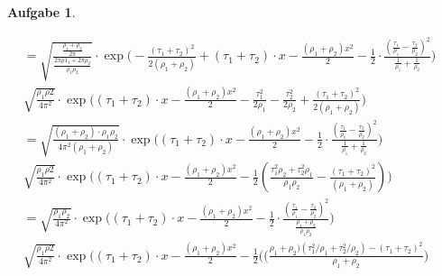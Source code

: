 \documentclass[12pt]{scrartcl}
\theoremstyle{definition}
\theoremstyle{exercise}
\newtheorem*{exercise*}{Aufgabe}
\begin{document}
\begin{exercise*}
\begin{enumerate}
\begin{align*}
					= \sqrt{\frac{\frac{\rho_{1} + \rho_{2}}{2 \pi}}{\frac{2 \pi \rho1_{1} + 2 \pi \rho_{2}}{\rho_{1} \rho_{2}}}}\cdot \exp\bigg(-\frac{(\tau_{1} + \tau_{2})^{2}}{2(\rho_{1} + \rho_{2})}+ (\tau_{1} + \tau_{2}) \cdot x - \frac{(\rho_{1} + \rho_{2})x^{2}}{2}- \frac{1}{2} \cdot \frac{(\frac{\tau_1}{\rho_1}- \frac{\tau_2}{\rho_2})^{2}}{\frac{1}{\rho_{1}} + \frac{1}{\rho_{2}}}\bigg)                                                                           &  \\
					\sqrt{\frac{\rho_{1} \rho2}{4 \pi^{2}}}\cdot \exp\bigg((\tau_{1} + \tau_{2}) \cdot x - \frac{(\rho_{1} + \rho_{2})x^{2}}{2}-\frac{\tau_{1}^{2}}{2\rho_{1}}-\frac{\tau_{2}^{2}}{2\rho_{2}}+ \frac{(\tau_{1} + \tau_{2})^{2}}{2(\rho_{1} + \rho_{2})}\bigg)                                                                                                                                                                                                          &  \\
					= \sqrt{\frac{(\rho_{1} + \rho_{2}) \cdot \rho_{1} \rho_{2}}{4 \pi^{2} (\rho_{1} + \rho_{2})}}\cdot \exp\bigg((\tau_{1} + \tau_{2}) \cdot x - \frac{(\rho_{1} + \rho_{2})x^{2}}{2}- \frac{1}{2} \cdot \frac{(\frac{\tau_1}{\rho_1}- \frac{\tau_2}{\rho_2})^{2}}{\frac{1}{\rho_{1}} + \frac{1}{\rho_{2}}}\bigg)                                                                                                                                                     &  \\
					\sqrt{\frac{\rho_{1} \rho2}{4 \pi^{2}}}\cdot \exp\bigg((\tau_{1} + \tau_{2}) \cdot x - \frac{(\rho_{1} + \rho_{2})x^{2}}{2}- \frac{1}{2}(\frac{\tau_{1}^{2}\rho_{2} + \tau_{2}^{2} \rho_{1}}{\rho_{1} \rho_{2}}- \frac{(\tau_{1} + \tau_{2})^{2}}{(\rho_{1} + \rho_{2})})\bigg)                                                                                                                                                                                    &  \\
					= \sqrt{\frac{\rho_{1} \rho_{2}}{4 \pi^{2}}}\cdot \exp\bigg((\tau_{1} + \tau_{2}) \cdot x - \frac{(\rho_{1} + \rho_{2})x^{2}}{2}- \frac{1}{2} \cdot \frac{(\frac{\tau_1}{\rho_1}- \frac{\tau_2}{\rho_2})^{2}}{\frac{\rho_{1} + \rho_{2}}{\rho_{1} \rho_{2}}}\bigg)                                                                                                                                                                                                 &  \\
					\sqrt{\frac{\rho_{1} \rho2}{4 \pi^{2}}}\cdot \exp\bigg((\tau_{1} + \tau_{2}) \cdot x - \frac{(\rho_{1} + \rho_{2})x^{2}}{2}- \frac{1}{2}((\frac{\rho_{1} + \rho_{2}) (\tau_{1}^{2}/\rho_{1} + \tau_{2}^{2} / \rho_{2})- (\tau_{1} + \tau_{2})^{2}}{\rho_{1} + \rho_{2}}\bigg)                                                                                                                                                                                      &  \\

\end{align*}
\end{enumerate}
\end{exercise*}
\end{document}
